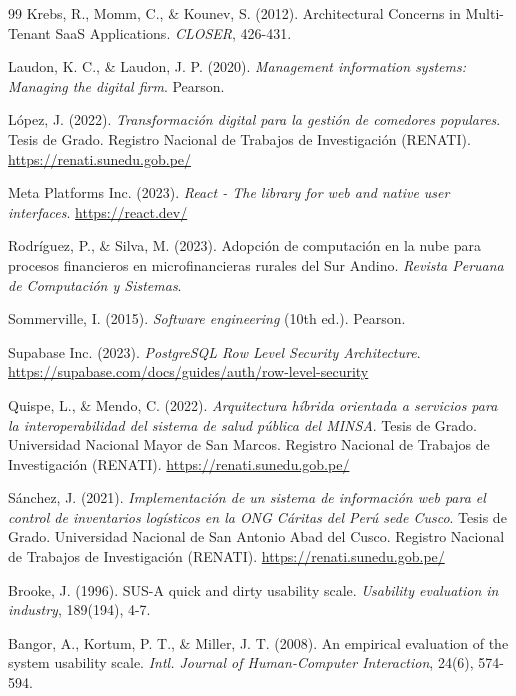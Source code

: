 \begin{thebibliography}{99}
Krebs, R., Momm, C., \& Kounev, S. (2012). Architectural Concerns in Multi-Tenant SaaS Applications. \textit{CLOSER}, 426-431.

Laudon, K. C., \& Laudon, J. P. (2020). \textit{Management information systems: Managing the digital firm}. Pearson.

L\'opez, J. (2022). \textit{Transformaci\'on digital para la gesti\'on de comedores populares}. Tesis de Grado. Registro Nacional de Trabajos de Investigaci\'on (RENATI). \url{https://renati.sunedu.gob.pe/}

Meta Platforms Inc. (2023). \textit{React - The library for web and native user interfaces}. \url{https://react.dev/}

Rodr\'iguez, P., \& Silva, M. (2023). Adopci\'on de computaci\'on en la nube para procesos financieros en microfinancieras rurales del Sur Andino. \textit{Revista Peruana de Computaci\'on y Sistemas}.

Sommerville, I. (2015). \textit{Software engineering} (10th ed.). Pearson.

Supabase Inc. (2023). \textit{PostgreSQL Row Level Security Architecture}. \url{https://supabase.com/docs/guides/auth/row-level-security}

Quispe, L., \& Mendo, C. (2022). \textit{Arquitectura h\'ibrida orientada a servicios para la interoperabilidad del sistema de salud p\'ublica del MINSA}. Tesis de Grado. Universidad Nacional Mayor de San Marcos. Registro Nacional de Trabajos de Investigaci\'on (RENATI). \url{https://renati.sunedu.gob.pe/}

S\'anchez, J. (2021). \textit{Implementaci\'on de un sistema de informaci\'on web para el control de inventarios log\'isticos en la ONG C\'aritas del Per\'u sede Cusco}. Tesis de Grado. Universidad Nacional de San Antonio Abad del Cusco. Registro Nacional de Trabajos de Investigaci\'on (RENATI). \url{https://renati.sunedu.gob.pe/}

Brooke, J. (1996). SUS-A quick and dirty usability scale. \textit{Usability evaluation in industry}, 189(194), 4-7.

Bangor, A., Kortum, P. T., \& Miller, J. T. (2008). An empirical evaluation of the system usability scale. \textit{Intl. Journal of Human-Computer Interaction}, 24(6), 574-594.


\end{thebibliography}
